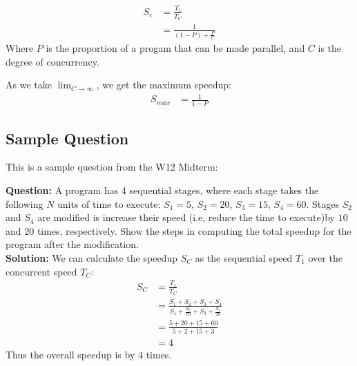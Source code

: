             \begin{align*}
                S_c &= \frac{T_1}{T_C} \\
                &= \frac{1}{(1-P) + \frac{P}{C}}
            \end{align*}
            Where $P$ is the proportion of a progam that can be made parallel, and $C$ is the degree of concurrency.

            As we take $\lim_{C \to \infty}$, we get the maximum speedup:
            \begin{align*}
                S_{max} &= \frac{1}{1-P}
            \end{align*}

            \subsection{Sample Question} %
            \label{sub:sample_question}
                This is a sample question from the W12 Midterm:

                \textbf{Question:}
                A program has 4 sequential stages, where each stage takes the following $N$ units of time to execute:
                $S_1 = 5$, $S_2 = 20$, $S_3 = 15$, $S_4 = 60$.
                Stages $S_2$ and $S_4$ are modified is increase their speed (i.e, reduce the time to execute)by $10$ and $20$ times, respectively.
                Show the steps in computing the total speedup for the program after the modification. \\

                \textbf{Solution:}
                We can calculate the speedup $S_C$ as the sequential speed $T_1$ over the concurrent speed $T_C$:
                \begin{align*}
                    S_C &= \frac{T_1}{T_C} \\
                    &= \frac{S_1 + S_2 + S_3 + S_4}{S_1 + \frac{S_2}{10} + S_3 + \frac{S_4}{20}} \\
                    &= \frac{5 + 20 + 15 + 60}{5 + 2 + 15 + 3} \\
                    &= 4
                \end{align*}
                Thus the overall speedup is by $4$ times.
